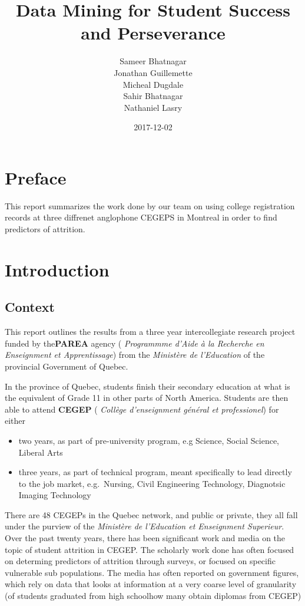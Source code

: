 \documentclass[]{book}
\title{Data Mining for Student Success and Perseverance}
\author{Sameer Bhatnagar \\ Jonathan Guillemette \\ Micheal Dugdale \\ Sahir Bhatnagar \\ Nathaniel Lasry}
\date{2017-12-02}
\providecommand{\tightlist}{%
  \setlength{\itemsep}{0pt}\setlength{\parskip}{0pt}}
\theoremstyle{definition}
\theoremstyle{definition}
\theoremstyle{remark}
\begin{document}
\maketitle

{
\setcounter{tocdepth}{1}
\tableofcontents
}
\chapter{Preface}\label{preface}

This report summarizes the work done by our team on using college
registration records at three diffrenet anglophone CEGEPS in Montreal in
order to find predictors of attrition.

\chapter{Introduction}\label{intro}

\section{Context}\label{context}

This report outlines the results from a three year intercollegiate
research project funded by the\textbf{PAREA} agency ( \emph{Programmme
d'Aide à la Recherche en Enseignment et Apprentissage}) from the
\emph{Ministère de l'Education} of the provincial Government of Quebec.

In the province of Quebec, students finish their secondary education at
what is the equivalent of Grade 11 in other parts of North America.
Students are then able to attend \textbf{CEGEP} ( \emph{Collège
d'enseignment général et professionel}) for either

\begin{itemize}
\tightlist
\item
  two years, as part of pre-university program, e.g Science, Social
  Science, Liberal Arts
\item
  three years, as part of technical program, meant specifically to lead
  directly to the job market, e.g.~Nursing, Civil Engineering
  Technology, Diagnotsic Imaging Technology
\end{itemize}

There are 48 CEGEPs in the Quebec network, and public or private, they
all fall under the purview of the \emph{Ministère de l'Education et
Enseignment Superieur}. Over the past twenty years, there has been
significant
work\citep{jorgensen2003students, jorgensen2005academic, jorgensen2009predicting, riviere1995decrocheurs, shaienks2008statcan}
and media
\citep{breton2016soleil, dion-viens2015lapresse, duchaine2017lapresse}
on the topic of student attrition in CEGEP. The scholarly work done has
often focused on determing predictors of attrition through surveys, or
focused on specific vulnerable sub populations. The media has often
reported on government figures, which rely on data that looks at
information at a very coarse level of granularity (of students graduated
from high schoolhow many obtain diplomas from CEGEP)
\end{document}
